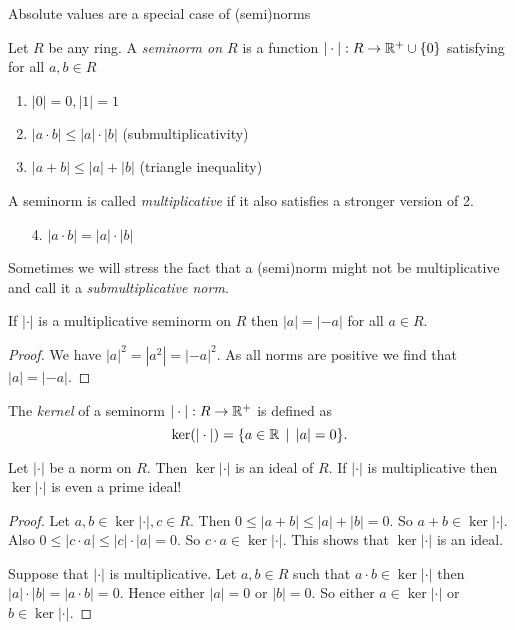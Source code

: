 Absolute values are a special case of (semi)norms
\begin{definition}
	Let $R$ be any ring. A \emph{seminorm on $R$} is a function $|\cdot |: R \to \mathbb{R}^{+} \cup \{0\} $ satisfying for all $a, b \in R$ 
	\begin{enumerate}
		\item $|0| = 0, |1| = 1$ 
		\item $|a \cdot b| \le |a| \cdot |b|$  (submultiplicativity)
		\item $|a + b| \le |a| + |b|$ (triangle inequality)
	\end{enumerate}
	A seminorm is called \emph{multiplicative} if it also satisfies a stronger version of 2. 
	\begin{enumerate}
		\item [4.]  $|a \cdot  b| = |a| \cdot |b|$
	\end{enumerate}
\end{definition}
Sometimes we will stress the fact that a (semi)norm might not be multiplicative and call it a \emph{submultiplicative norm}. 

\begin{lemma}
	If $|\cdot |$ is a multiplicative seminorm on $R$ then  $|a | = |-a|$ for all $a \in R$. 
\end{lemma}
\begin{proof}
	We have $|a|^2 = |a^2| = |-a|^2$. As all norms are positive we find that $|a| = |-a|$. 
\end{proof}

\begin{definition}
	The \emph{kernel} of a seminorm $|\cdot |: R \to \mathbb{R}^{+}$ is defined as \[
		\ker(|\cdot |) = \{a \in \R \st |a| = 0\} 
	.\] 
\end{definition}
\begin{remark}\label{rem:ker_norm_ideal}
	Let $ |\cdot |$ be a norm on $R$. Then $\ker |\cdot |$ is an ideal of $R$. If $|\cdot |$ is multiplicative then $\ker |\cdot |$ is even a prime ideal!
\end{remark}
\begin{proof}
	Let $a, b \in \ker |\cdot |, c \in R$. Then $0 \le |a + b| \le |a|+|b| = 0$. So  $a + b \in \ker |\cdot |$. 
	Also $0 \le |c \cdot a| \le |c|\cdot |a| = 0$. So $c \cdot a \in \ker |\cdot |$. 
	This shows that $\ker |\cdot  |$ is an ideal. 
	
	Suppose that $|\cdot |$ is multiplicative. 
	Let $a, b\in R $ such that $a\cdot b \in \ker |\cdot |$ then  $|a|\cdot |b| = |a\cdot b| = 0$. 
	Hence either $|a| = 0$ or  $|b|=0$. 
	So either  $a \in \ker |\cdot |$ or $b \in \ker |\cdot |$. 
\end{proof}

